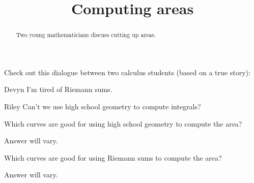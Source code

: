 \documentclass{ximera}
\title[Break-Ground:]{Computing areas}
\begin{document}
\begin{abstract}
Two young mathematicians discuss cutting up areas.
\end{abstract}
\maketitle

Check out this dialogue between two calculus students (based on a true
story):



\begin{dialogue}
\item[Devyn] I'm tired of Riemann sums.
\item[Riley] Can't we use high school geometry to compute integrals?
\end{dialogue}

\begin{problem}
  Which curves are good for using high school geometry to compute the area?
  \begin{freeResponse}
    Answer will vary.
  \end{freeResponse}
\end{problem}

\begin{problem}
  Which curves are good for using Riemann sums to compute the area?
  \begin{freeResponse}
    Answer will vary.
  \end{freeResponse}
\end{problem}




\end{document}
